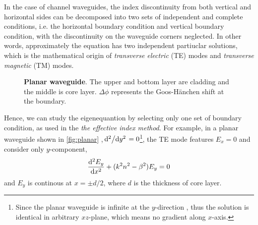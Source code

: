 \documentclass[final]{kuee_en}
\begin{document}
In the case of channel waveguides, the index discontinuity from both vertical and horizontal sides can be decomposed into two sets of independent and complete conditions, i.e. the horizontal boundary condition and vertical boundary condition, with the discontinuity on the waveguide corners neglected. In other words, approximately the equation has two independent partiuclar solutions, which is the mathematical origin of \textit{ transverse electric} (TE) modes and \textit{transverse magnetic} (TM) modes.

\begin{figure}
\centering
{}
\caption{\textbf{Planar waveguide}. The upper and bottom layer are cladding and the middle is core layer. $\Delta \phi$ represents the Goos-H\"{a}nchen shift at the boundary.}
\label{fig:planar}
\end{figure}

Hence, we can study the eigenequantion by selecting only one set of boundary condition, as used in the \textit{the effective index method}. For example, in a planar waveguide shown in \autoref{fig:planar} ,$\dv*[2]{}{y}=0$\footnote{Since the planar waveguide is infinite at the $y$-direction , thus the solution is identical in arbitrary $xz$-plane, which means no gradient along $x$-axis.},
the TE mode features $E_x=0$ and consider only $y$-component, 
\begin{equation}
    \dv[2]{E_y}{x} + (k^2 n^2 - \beta^2)E_y =0
\end{equation}
and $E_y$ is continous at $x=\pm d/2$, where $d$ is the thickness of core layer.
\end{document}
